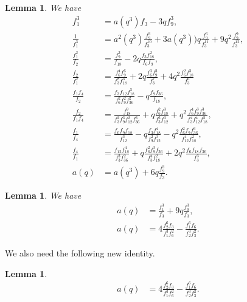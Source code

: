 \documentclass[12pt]{article}
\numberwithin{equation}{section}
\theoremstyle{plain}
\numberwithin{theorem}{section}
\newtheorem{lemma}[theorem]{Lemma}
\theoremstyle{definition}
\theoremstyle{remark}
\begin{document}
    \begin{lemma}\label{Lemma 3d}
    \cite{Hir17} We have
    \begin{align}
    f_1^3  &=a(q^3) f_3-3q f_9^3,\label{3d f1^3}\\
    \frac{1}{f_1^3}&=a^2(q^3)\frac{f_9^3}{f_3^{10}}+3 a(q^3)) q\frac{f_9^6}{f_3^{11}}+9 q^2\frac{f_9^9}{f_3^{12}},\label{3d 1/f1^3}\\
    \frac{f_1^2}{f_2} &=\frac{f_9^2}{f_{18}}-2 q\frac{f_3 f_{18}^2}{f_6 f_9},\label{3d f1^2/f2}\\
       \frac{f_2}{f_1^2} &=\frac{f_{6}^4 f_{9}^6}{f_{3}^8 f_{18}^3}+2q\frac{f_{6}^3 f_{9}^3}{f_{3}^7}+4q^2\frac{f_{6}^2 f_{18}^3}{f_{3}^6} \label{3d f2/f1^2}\\
       \frac{f_1 f_4}{f_2}&=\frac{f_3 f_{12} f_{18}^5}{f_6^2 f_9^2 f_{36}^2}-q\frac{f_9 f_{36}}{f_{18}},\label{3d f1f4/f2}\\
       \frac{f_2}{f_1 f_4}&=\frac{f_{18}^9}{f_3^2 f_9^3 f_{12}^2 f_{36}^3}+q \frac{f_6^2 f_{18}^3}{f_3^3 f_{12}^3}+q^2\frac{f_6^4 f_9^3 f_{36}^3}{f_3^4 f_{12}^4 f_{18}^3},\label{3d f2/f1f4}\\
       \frac{f_1}{f_4}&=\frac{f_6 f_9 f_{18}}{f_{12}^3}-q \frac{f_3 f_{18}^4}{f_9^2 f_{12}^3}-q^2 \frac{f_6^2 f_9 f_{36}^3}{f_{12}^4 f_{18}^2},\label{3d f1/f4}\\
      \frac{f_4}{f_1} &=\frac{f_{12} f_{18}^4}{f_3^3 f_{36}^2}+q \frac{f_6^2 f_9^3 f_{36}}{f_3^4 f_{18}^2}+2q^2 \frac{f_6 f_{18} f_{36}}{f_3^3},\label{3d f4/f1}\\
        a(q)&=a(q^3)+6q\frac{f_9^3}{f_3}.\label{3d a}
    \end{align}
    \end{lemma}
\begin{lemma}
    \cite[Sect. 22.10 and (22.1.6), (10.9.4)]{Hir17} We have
    \begin{align}
       \label{a(q) Id}a(q)&= \frac{f_1^3}{f_3}+9q\frac{f_9^3}{f_3},\\
       a(q)&=4\frac{f_2^6 f_3}{f_1^3 f_6^2}-\frac{f_1^6 f_6}{f_2^3 f_3^2}.\label{id:a(q)}
    \end{align}
\end{lemma}
We also need the following new identity.
\iffalse
\begin{lemma}
    \cite[Eq. (10.9.4)]{Hir17}
    \begin{align}
        a(q)&=4\frac{f_2^6 f_3}{f_1^3 f_6^2}-\frac{f_1^6 f_6}{f_2^3 f_3^2}.\label{id:a(q)}
    \end{align}
\end{lemma}
\end{document}
